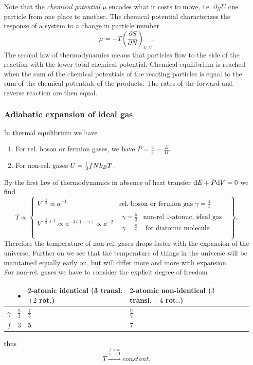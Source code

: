 Note that the \emph{chemical potential} $\mu$ encodes what it costs to move, i.e. $\partial_N U$ one particle from one place to another. The chemical potential characterizes the response of a system to a change in particle number
\begin{equation}
\label{eq:chemicalpotential}
	\mu = - T \left(\frac{\partial S}{\partial N}\right)_{U,V}.
\end{equation}
The second law of thermodynamics means that particles flow to the side of the reaction with the lower total chemical potential. Chemical equilibrium is reached when the sum of the chemical potentials of the reacting particles is equal to the sum of the chemical potentials of the products. The rates of the forward and reverse reaction are then equal.
\subsubsection{Adiabatic expansion of ideal gas}
In thermal equilibrium we have
\begin{enumerate}
	\item For rel. boson or fermion gases, we have $P=\frac{u}{3}= \frac{E}{3V}$
	\item For non-rel. gases $U = \frac{1}{2} f N k_B T$.
\end{enumerate}
By the first law of thermodynamics in absence of heat transfer $\mathrm{d} E + P\mathrm{d} V=0$ we find
\begin{equation}
T\propto \left\{\begin{array}{ll}
V^{-\frac{1}{3}} \propto a^{-1} & \text{rel. boson or fermion gas }\gamma=\frac{4}{3} \\
V^{-\frac{5}{3}+1} \propto a^{-3(1-\gamma)} \propto a^{-2} & \begin{array}{ll}
\gamma=\frac{5}{3}&\text{non-rel 1-atomic, ideal gas } \\
\gamma=\frac{9}{7}& \text{ for diatomic molecule}\\
\end{array}
\end{array}			\right\}.
\end{equation}
Therefore the temperature of non-rel. gases drops faster with the expansion of the universe. Further on we see that the temperature of things in the universe will be maintained equally early on, but will differ more and more with expansion.\\
For non-rel. gases we have to consider the explicit degree of freedom

	 \begin{tabular}{|l|llll|}
	& $\bullet$ & $2$-atomic identical (3 transl.$+2$ rot.) & $2$-atomic non-identical ($3$ transl. $+4$ rot..) \\
	\toprule
$\gamma$ &$\frac{5}{3}$ & $\frac{7}{5}$ & $\frac{9}{7}$\\
$f$ & $3$ & $5$ & $7$ \\
	\bottomrule
\end{tabular}
thus
\begin{equation}
	T\stackrel{\stackrel{f\rightarrow\infty}{\gamma \longrightarrow 1}}{\longrightarrow} constant.
\end{equation}



